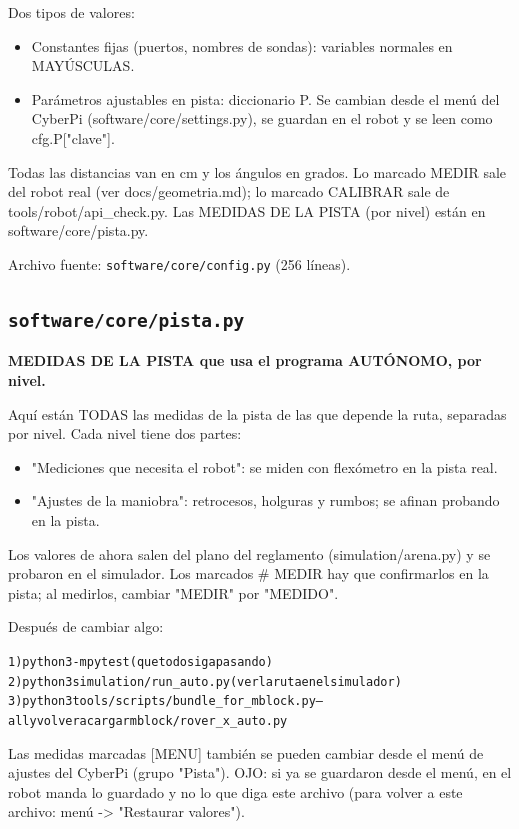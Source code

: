 Dos tipos de valores:

\begin{itemize}\setlength\itemsep{0pt}
\item Constantes fijas (puertos, nombres de sondas): variables normales en MAYÚSCULAS.
\item Parámetros ajustables en pista: diccionario P. Se cambian desde el menú del CyberPi (software/core/settings.py), se guardan en el robot y se leen como cfg.P["clave"].
\end{itemize}
Todas las distancias van en cm y los ángulos en grados. Lo marcado MEDIR sale del robot real (ver docs/geometria.md); lo marcado CALIBRAR sale de tools/robot/api\_check.py. Las MEDIDAS DE LA PISTA (por nivel) están en software/core/pista.py.

\noindent Archivo fuente: \texttt{software/core/config.py} (256 l\'ineas).

\subsection{\texttt{software/core/pista.py}}\label{mod:pista}
\textbf{MEDIDAS DE LA PISTA que usa el programa AUTÓNOMO, por nivel.}

Aquí están TODAS las medidas de la pista de las que depende la ruta, separadas por nivel. Cada nivel tiene dos partes:

\begin{itemize}\setlength\itemsep{0pt}
\item "Mediciones que necesita el robot": se miden con flexómetro en la pista real.
\item "Ajustes de la maniobra": retrocesos, holguras y rumbos; se afinan probando en la pista.
\end{itemize}
Los valores de ahora salen del plano del reglamento (simulation/arena.py) y se probaron en el simulador. Los marcados  \# MEDIR  hay que confirmarlos en la pista; al medirlos, cambiar "MEDIR" por "MEDIDO".

Después de cambiar algo:

{\small\begin{alltt}
1) python3 -m pytest              (que todo siga pasando)
2) python3 simulation/run\_auto.py (ver la ruta en el simulador)
3) python3 tools/scripts/bundle\_for\_mblock.py --all   y volver a cargar mblock/rover\_x\_auto.py
\end{alltt}}
Las medidas marcadas [MENU] también se pueden cambiar desde el menú de ajustes del CyberPi (grupo "Pista"). OJO: si ya se guardaron desde el menú, en el robot manda lo guardado y no lo que diga este archivo (para volver a este archivo: menú -> "Restaurar valores").

